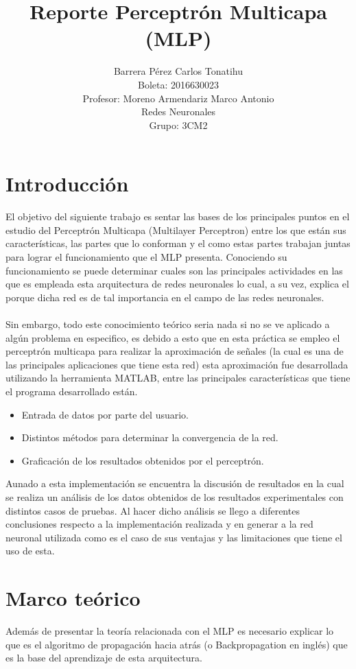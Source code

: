\documentclass[12pt, titlepage]{article}
\title{Reporte Perceptrón Multicapa (MLP)}
\author{Barrera Pérez Carlos Tonatihu \\Boleta: 2016630023\\ Profesor: Moreno 
Armendariz Marco Antonio \\ Redes Neuronales \\ Grupo: 3CM2 }
\begin{document}
\maketitle
\tableofcontents
\newpage

\section{Introducción}
El objetivo del siguiente trabajo es sentar las bases de los principales puntos 
en el estudio del Perceptrón Multicapa (Multilayer Perceptron) entre los que 
están sus características, las partes que lo conforman y el como estas partes 
trabajan juntas para lograr el funcionamiento que el MLP presenta. Conociendo 
su funcionamiento se puede determinar cuales son las principales actividades en 
las que es empleada esta arquitectura de redes neuronales lo cual, a su vez, 
explica el porque dicha red es de tal importancia en el campo de las redes 
neuronales.
\\\\
Sin embargo, todo este conocimiento teórico seria nada si no se ve aplicado a 
algún problema en especifico, es debido a esto que en esta práctica se empleo 
el perceptrón multicapa para realizar la aproximación de señales (la cual es 
una de las principales aplicaciones que tiene esta red) esta aproximación fue 
desarrollada utilizando la herramienta MATLAB, entre las principales 
características que tiene el programa desarrollado están.
\begin{itemize}
 \item Entrada de datos por parte del usuario.
 \item Distintos métodos para determinar la convergencia de la red.
 \item Graficación de los resultados obtenidos por el perceptrón.
\end{itemize}
Aunado a esta implementación se encuentra la discusión de resultados en la cual 
se realiza un análisis de los datos obtenidos de los resultados 
experimentales con distintos casos de pruebas. Al hacer dicho análisis se llego 
a diferentes conclusiones respecto a la implementación realizada y en generar a 
la red neuronal utilizada como es el caso de sus ventajas y las limitaciones 
que tiene el uso de esta.

\newpage
\section{Marco teórico}
Además de presentar la teoría relacionada con el MLP es necesario explicar lo que es el algoritmo de propagación hacia atrás (o Backpropagation en inglés) que es la base del aprendizaje de esta arquitectura.
\end{document}
